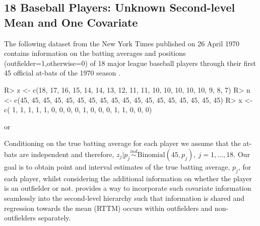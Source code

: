 \documentclass[article]{jss}
\begin{document}
\subsection[Unknown Second-level Mean and One Covariate]{18 Baseball Players: Unknown Second-level Mean and One Covariate}

The following dataset from the New York Times published on 26 April 1970 contains information on the batting averages and positions (outfielder=1,otherwise=0) of 18 major league baseball players through their first 45 official at-bats of the 1970 season \citep{1975}.

\begin{CodeChunk}
\begin{CodeInput}
R> z <- c(18, 17, 16, 15, 14, 14, 13, 12, 11, 11, 10, 10, 10, 10, 10,  9,  8,  7)
R> n <- c(45, 45, 45, 45, 45, 45, 45, 45, 45, 45, 45, 45, 45, 45, 45, 45, 45, 45)
R> x <- c( 1,  1,  1,  1,  1,  0,  0,  0,  0,  1,  0,  0,  0,  1,  1,  0,  0,  0) 
\end{CodeInput}
\end{CodeChunk}
or
\begin{CodeChunk}
\end{CodeChunk}
Conditioning on the true batting average for each player we assume that the at-bats are independent and therefore, $z_{j}\vert p_{j} \textrm{Binomial}(45, p_{j}), ~j=1, \ldots, 18$. Our goal is to obtain point and interval estimates of the true batting average, $p_{j}$, for each player, whilst considering the additional information on whether the player is an outfielder or not.  provides a way to incorporate such covariate information seamlessly into the second-level hierarchy such that information is shared and regression towards the mean (RTTM) occurs within outfielders and non-outfielders separately. %
\end{document}

